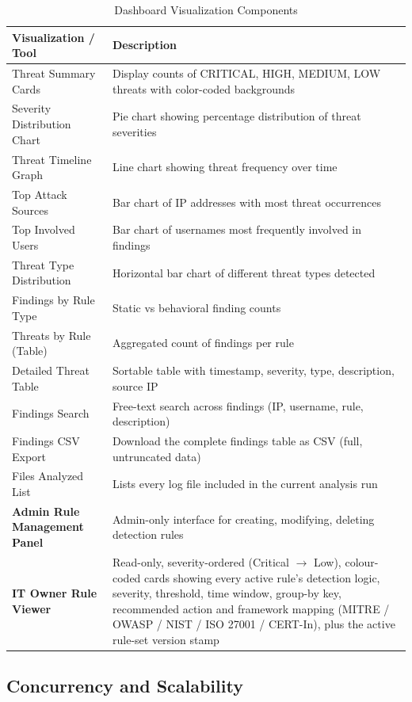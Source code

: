 \documentclass[12pt,a4paper]{article}
\begin{document}
\begin{table}[H]
\centering
\begin{tabular}{|p{4cm}|p{10cm}|}
\hline
\textbf{Visualization / Tool} & \textbf{Description} \\
\hline
Threat Summary Cards & Display counts of CRITICAL, HIGH, MEDIUM, LOW threats with color-coded backgrounds \\
\hline
Severity Distribution Chart & Pie chart showing percentage distribution of threat severities \\
\hline
Threat Timeline Graph & Line chart showing threat frequency over time \\
\hline
Top Attack Sources & Bar chart of IP addresses with most threat occurrences \\
\hline
Top Involved Users & Bar chart of usernames most frequently involved in findings \\
\hline
Threat Type Distribution & Horizontal bar chart of different threat types detected \\
\hline
Findings by Rule Type & Static vs behavioral finding counts \\
\hline
Threats by Rule (Table) & Aggregated count of findings per rule \\
\hline
Detailed Threat Table & Sortable table with timestamp, severity, type, description, source IP \\
\hline
Findings Search & Free-text search across findings (IP, username, rule, description) \\
\hline
Findings CSV Export & Download the complete findings table as CSV (full, untruncated data) \\
\hline
Files Analyzed List & Lists every log file included in the current analysis run \\
\hline
\textbf{Admin Rule Management Panel} & Admin-only interface for creating, modifying, deleting detection rules \\
\hline
\textbf{IT Owner Rule Viewer} & Read-only, severity-ordered (Critical $\rightarrow$ Low), colour-coded cards showing every active rule's detection logic, severity, threshold, time window, group-by key, recommended action and framework mapping (MITRE / OWASP / NIST / ISO 27001 / CERT-In), plus the active rule-set version stamp \\
\hline
\end{tabular}
\caption{Dashboard Visualization Components}
\label{tab:visualizations}
\end{table}

\subsection{Concurrency and Scalability}
\end{document}
